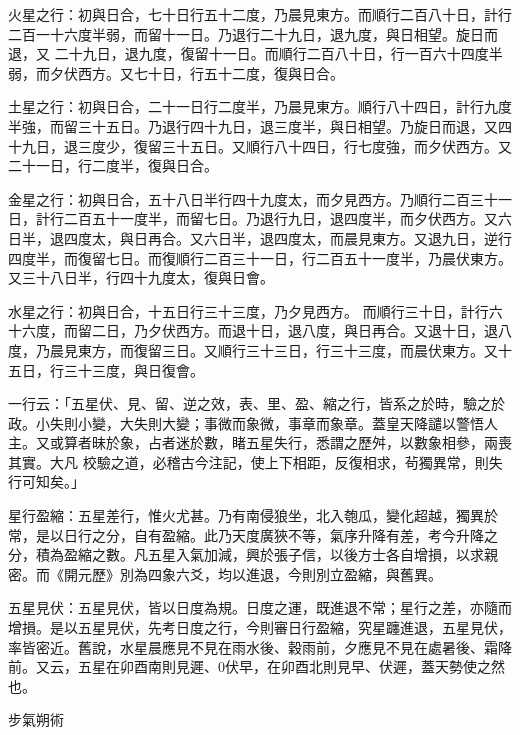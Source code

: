 \begin{pinyinscope}
 火星之行：初與日合，七十日行五十二度，乃晨見東方。而順行二百八十日，計行二百一十六度半弱，而留十一日。乃退行二十九日，退九度，與日相望。旋日而退，又
 二十九日，退九度，復留十一日。而順行二百八十日，行一百六十四度半弱，而夕伏西方。又七十日，行五十二度，復與日合。



 土星之行：初與日合，二十一日行二度半，乃晨見東方。順行八十四日，計行九度半強，而留三十五日。乃退行四十九日，退三度半，與日相望。乃旋日而退，又四十九日，退三度少，復留三十五日。又順行八十四日，行七度強，而夕伏西方。又二十一日，行二度半，復與日合。



 金星之行：初與日合，五十八日半行四十九度太，而夕見西方。乃順行二百三十一日，計行二百五十一度半，而留七日。乃退行九日，退四度半，而夕伏西方。又六日半，退四度太，與日再合。又六日半，退四度太，而晨見東方。又退九日，逆行四度半，而復留七日。而復順行二百三十一日，行二百五十一度半，乃晨伏東方。又三十八日半，行四十九度太，復與日會。



 水星之行：初與日合，十五日行三十三度，乃夕見西方。
 而順行三十日，計行六十六度，而留二日，乃夕伏西方。而退十日，退八度，與日再合。又退十日，退八度，乃晨見東方，而復留三日。又順行三十三日，行三十三度，而晨伏東方。又十五日，行三十三度，與日復會。



 一行云：「五星伏、見、留、逆之效，表、里、盈、縮之行，皆系之於時，驗之於政。小失則小變，大失則大變；事微而象微，事章而象章。蓋皇天降譴以警悟人主。又或算者昧於象，占者迷於數，睹五星失行，悉謂之歷舛，以數象相參，兩喪其實。大凡
 校驗之道，必稽古今注記，使上下相距，反復相求，茍獨異常，則失行可知矣。」



 星行盈縮：五星差行，惟火尤甚。乃有南侵狼坐，北入匏瓜，變化超越，獨異於常，是以日行之分，自有盈縮。此乃天度廣狹不等，氣序升降有差，考今升降之分，積為盈縮之數。凡五星入氣加減，興於張子信，以後方士各自增損，以求親密。而《開元歷》別為四象六爻，均以進退，今則別立盈縮，與舊異。



 五星見伏：五星見伏，皆以日度為規。日度之運，既進退不常；星行之差，亦隨而增損。是以五星見伏，先考日度之行，今則審日行盈縮，究星躔進退，五星見伏，率皆密近。舊說，水星晨應見不見在雨水後、穀雨前，夕應見不見在處暑後、霜降前。又云，五星在卯酉南則見遲、0伏早，在卯酉北則見早、伏遲，蓋天勢使之然也。



 步氣朔術




\end{pinyinscope}
